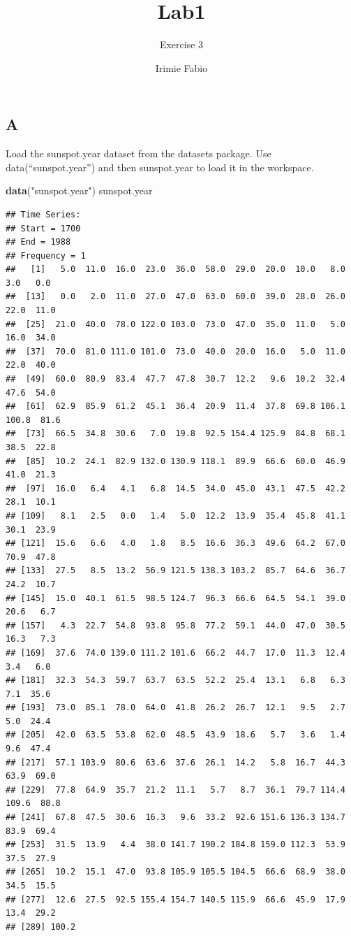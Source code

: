 \documentclass[
]{article}
\title{Lab1}
\subtitle{Exercise 3}
\author{Irimie Fabio}
\date{}
\newenvironment{Shaded}{\begin{snugshade}}{\end{snugshade}}
\newcommand{\FunctionTok}[1]{\textcolor[rgb]{0.13,0.29,0.53}{\textbf{#1}}}
\newcommand{\NormalTok}[1]{#1}
\newcommand{\StringTok}[1]{\textcolor[rgb]{0.31,0.60,0.02}{#1}}
\begin{document}
\maketitle

{
\setcounter{tocdepth}{2}
\tableofcontents
}
\hypertarget{a}{%
\subsection{A}\label{a}}

Load the sunspot.year dataset from the datasets package. Use
data(``sunspot.year'') and then sunspot.year to load it in the
workspace.

\begin{Shaded}
\begin{Highlighting}[]
\FunctionTok{data}\NormalTok{(}\StringTok{"sunspot.year"}\NormalTok{)}
\NormalTok{sunspot.year}
\end{Highlighting}
\end{Shaded}

\begin{verbatim}
## Time Series:
## Start = 1700 
## End = 1988 
## Frequency = 1 
##   [1]   5.0  11.0  16.0  23.0  36.0  58.0  29.0  20.0  10.0   8.0   3.0   0.0
##  [13]   0.0   2.0  11.0  27.0  47.0  63.0  60.0  39.0  28.0  26.0  22.0  11.0
##  [25]  21.0  40.0  78.0 122.0 103.0  73.0  47.0  35.0  11.0   5.0  16.0  34.0
##  [37]  70.0  81.0 111.0 101.0  73.0  40.0  20.0  16.0   5.0  11.0  22.0  40.0
##  [49]  60.0  80.9  83.4  47.7  47.8  30.7  12.2   9.6  10.2  32.4  47.6  54.0
##  [61]  62.9  85.9  61.2  45.1  36.4  20.9  11.4  37.8  69.8 106.1 100.8  81.6
##  [73]  66.5  34.8  30.6   7.0  19.8  92.5 154.4 125.9  84.8  68.1  38.5  22.8
##  [85]  10.2  24.1  82.9 132.0 130.9 118.1  89.9  66.6  60.0  46.9  41.0  21.3
##  [97]  16.0   6.4   4.1   6.8  14.5  34.0  45.0  43.1  47.5  42.2  28.1  10.1
## [109]   8.1   2.5   0.0   1.4   5.0  12.2  13.9  35.4  45.8  41.1  30.1  23.9
## [121]  15.6   6.6   4.0   1.8   8.5  16.6  36.3  49.6  64.2  67.0  70.9  47.8
## [133]  27.5   8.5  13.2  56.9 121.5 138.3 103.2  85.7  64.6  36.7  24.2  10.7
## [145]  15.0  40.1  61.5  98.5 124.7  96.3  66.6  64.5  54.1  39.0  20.6   6.7
## [157]   4.3  22.7  54.8  93.8  95.8  77.2  59.1  44.0  47.0  30.5  16.3   7.3
## [169]  37.6  74.0 139.0 111.2 101.6  66.2  44.7  17.0  11.3  12.4   3.4   6.0
## [181]  32.3  54.3  59.7  63.7  63.5  52.2  25.4  13.1   6.8   6.3   7.1  35.6
## [193]  73.0  85.1  78.0  64.0  41.8  26.2  26.7  12.1   9.5   2.7   5.0  24.4
## [205]  42.0  63.5  53.8  62.0  48.5  43.9  18.6   5.7   3.6   1.4   9.6  47.4
## [217]  57.1 103.9  80.6  63.6  37.6  26.1  14.2   5.8  16.7  44.3  63.9  69.0
## [229]  77.8  64.9  35.7  21.2  11.1   5.7   8.7  36.1  79.7 114.4 109.6  88.8
## [241]  67.8  47.5  30.6  16.3   9.6  33.2  92.6 151.6 136.3 134.7  83.9  69.4
## [253]  31.5  13.9   4.4  38.0 141.7 190.2 184.8 159.0 112.3  53.9  37.5  27.9
## [265]  10.2  15.1  47.0  93.8 105.9 105.5 104.5  66.6  68.9  38.0  34.5  15.5
## [277]  12.6  27.5  92.5 155.4 154.7 140.5 115.9  66.6  45.9  17.9  13.4  29.2
## [289] 100.2
\end{verbatim}
\end{document}
